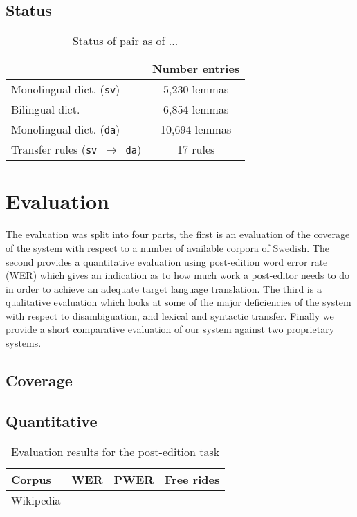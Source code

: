 \documentclass[11pt]{article}
\begin{document}
\subsection{Status}

\begin{table}
\centering
\begin{tabular}{|l|c|}
\hline
                                           & Number entries\\
\hline
Monolingual dict. ({\tt sv})               & 5,230 lemmas \\
Bilingual dict.                            & 6,854 lemmas \\
Monolingual dict. ({\tt da})               & 10,694 lemmas \\
Transfer rules ({\tt sv $\rightarrow$ da}) & 17 rules \\
\hline
\end{tabular}
    \caption{Status of pair as of ...}
    \label{table:status}
\end{table}

\section{Evaluation}

The evaluation was split into four parts, the first is an evaluation of the coverage
of the system with respect to a number of available corpora of Swedish. The second
provides a quantitative evaluation using post-edition word error rate (WER) which 
gives an indication as to how much work a post-editor needs to do in order to 
achieve an adequate target language translation. The third is a qualitative evaluation
which looks at some of the major deficiencies of the system with respect to disambiguation,
and lexical and syntactic transfer. Finally we provide a short comparative evaluation of
our system against two proprietary systems.

\subsection{Coverage}


\subsection{Quantitative}

\begin{table}
\centering
\begin{tabular}{|l|c|c|c|}
\hline
Corpus    & WER & PWER & Free rides\\
\hline
Wikipedia & -   & -    & -\\
\hline
\end{tabular}
    \caption{Evaluation results for the post-edition task}
    \label{table:quanteval}
\end{table}
\end{document}
